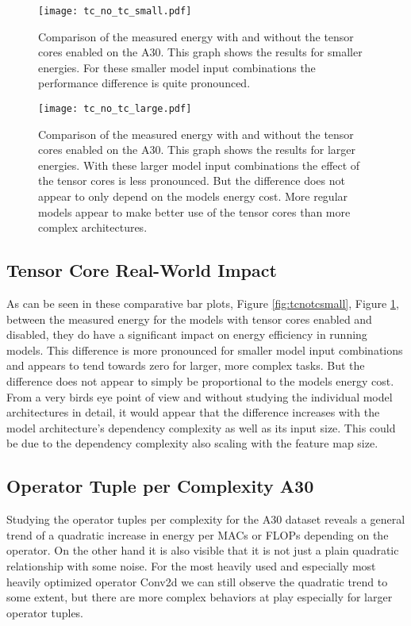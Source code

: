 \documentclass[conference]{IEEEtran}
\begin{document}
\begin{figure}
    \texttt{[image: tc\_no\_tc\_small.pdf]}
    \caption{Comparison of the measured energy with and without the tensor cores enabled on the A30. This graph shows the results for smaller energies. For these smaller model input combinations the performance difference is quite pronounced.}
    \label{fig:tcnotcsmall}
    \texttt{[image: tc\_no\_tc\_large.pdf]}
    \caption{Comparison of the measured energy with and without the tensor cores enabled on the A30. This graph shows the results for larger energies. With these larger model input combinations the effect of the tensor cores is less pronounced. But the difference does not appear to only depend on the models energy cost. More regular models appear to make better use of the tensor cores than more complex architectures.}
    \label{fig:tcnotclarge}
\end{figure}


\subsection{Tensor Core Real-World Impact}
As can be seen in these comparative bar plots, Figure \ref{fig:tcnotcsmall}, Figure \ref{fig:tcnotclarge}, between the measured energy for the models with tensor cores enabled and disabled, they do have a significant impact on energy efficiency in running models. This difference is more pronounced for smaller model input combinations and appears to tend towards zero for larger, more complex tasks. But the difference does not appear to simply be proportional to the models energy cost. From a very birds eye point of view and without studying the individual model architectures in detail, it would appear that the difference increases with the model architecture's dependency complexity as well as its input size. This could be due to the dependency complexity also scaling with the feature map size.

\subsection{Operator Tuple per Complexity A30}
Studying the operator tuples per complexity for the A30 dataset reveals a general trend of a quadratic increase in energy per MACs or FLOPs depending on the operator. On the other hand it is also visible that it is not just a plain quadratic relationship with some noise. For the most heavily used and especially most heavily optimized operator Conv2d we can still observe the quadratic trend to some extent, but there are more complex behaviors at play especially for larger operator tuples. 
\end{document}
